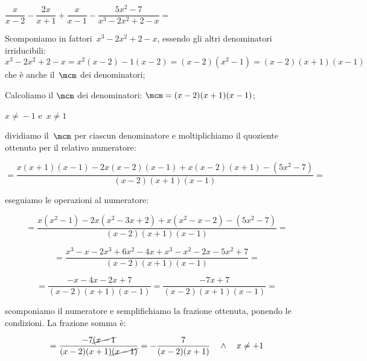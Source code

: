  \begin{esempio}
$\dfrac{x}{x-2}-\dfrac{2x}{x+1}+
\dfrac{x}{x-1}-\dfrac{5x^{2}-7}{x^{3}-2x^{2}+2-x}=$
\begin{enumeratea}
 \item Scomponiamo in fattori~$x^{3}-2x^{2}+2-x$, 
  essendo gli altri denominatori irriducibili: 
  $x^{3}-2x^{2}+2-x=x^2(x-2)-1(x-2)=(x-2)\left(x^2-1\right)=
   (x-2)(x+1)(x-1)$ che è anche il~$\mcm$ dei denominatori;

 \item Calcoliamo il $\mcm$ dei denominatori: 
  $\mcm=(x-2)(x+1)(x-1)$;
  
${x\neq}-1$ e~${x\neq}1$
 \item dividiamo il~$\mcm$ per ciascun denominatore e moltiplichiamo il 
  quoziente ottenuto per il relativo numeratore:
  
 \[=\frac{x(x+1)(x-1)-2x(x-2)(x-1)+x(x-2)(x+1)-(5x^{2}-7)}{(x-2)(x+1)(x-1)}=\]
 
 
 \item eseguiamo le operazioni al numeratore:
 
  \[=\frac{x(x^2-1)-2x(x^2-3x+2)+x(x^2-x-2)-(5x^{2}-7)}{(x-2)(x+1)(x-1)} = \]
  
  \[=\frac{x^3-x-2x^3+6x^2-4x+x^3-x^2-2x-5x^2+7}{(x-2)(x+1)(x-1)}=\]
 
  \[=\frac{-x-4x-2x+7}{(x-2)(x+1)(x-1)}=\frac{-7x+7}{(x-2)(x+1)(x-1)}=\]
 
 \item scomponiamo il numeratore e semplifichiamo la frazione ottenuta, 
  ponendo le condizioni. La frazione somma è:
 
  \[=\frac{-7\cancel{(x-1}}{(x-2)(x+1)\cancel{(x-1)}}=
    -{\frac{7}{(x-2)(x+1)}} \quad \wedge \quad x \neq +1\]
 
 \end{enumeratea}
 \end{esempio}

